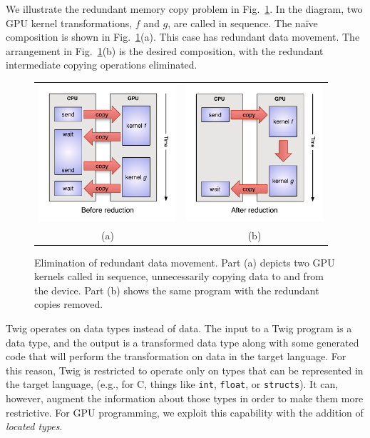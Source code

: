 We illustrate the redundant memory copy problem in Fig.~\ref{basic-idea}. In the diagram, two GPU kernel transformations, $f$ and $g$, are called in sequence. The na\"ive composition is shown in Fig.~\ref{basic-idea}(a). This case has redundant data movement. The arrangement in Fig.~\ref{basic-idea}(b) is the desired composition, with the redundant intermediate copying operations eliminated.

\begin{figure}[ht]
\centering
\begin{tabular}{cc}
\includegraphics[width=2in]{images/reduction-before}&
\includegraphics[width=2in]{images/reduction-after}\\
(a)&(b)\\
\end{tabular}
\caption{Elimination of redundant data movement. Part (a) depicts two GPU kernels called in sequence, unnecessarily copying data to and from the device. Part (b) shows the same program with the redundant copies removed.}
\label{basic-idea}
\end{figure}

Twig operates on data types instead of data. The input to a Twig program is a data type, and the output is a transformed data type along with some generated code that will perform the transformation on data in the target language. For this reason, Twig is restricted to operate only on types that can be represented in the target language, (e.g., for C, things like \texttt{int}, \texttt{float}, or \texttt{structs}). It can, however, augment the information about those types in order to make them more restrictive. For GPU programming, we exploit this capability with the addition of \emph{located types}.

